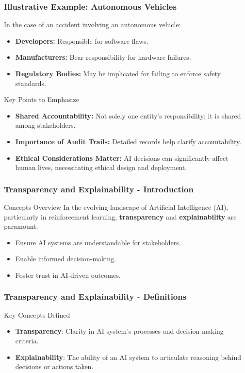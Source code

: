 \documentclass[aspectratio=169]{beamer}
\begin{document}
\begin{frame}[fragile]
    \frametitle{Illustrative Example: Autonomous Vehicles}
    In the case of an accident involving an autonomous vehicle:
    \begin{itemize}
        \item \textbf{Developers:} Responsible for software flaws.
        \item \textbf{Manufacturers:} Bear responsibility for hardware failures.
        \item \textbf{Regulatory Bodies:} May be implicated for failing to enforce safety standards.
    \end{itemize}

    \begin{block}{Key Points to Emphasize}
        \begin{itemize}
            \item \textbf{Shared Accountability:} Not solely one entity's responsibility; it is shared among stakeholders.
            \item \textbf{Importance of Audit Trails:} Detailed records help clarify accountability.
            \item \textbf{Ethical Considerations Matter:} AI decisions can significantly affect human lives, necessitating ethical design and deployment.
        \end{itemize}
    \end{block}
\end{frame}

\begin{frame}[fragile]
    \frametitle{Transparency and Explainability - Introduction}
    \begin{block}{Concepts Overview}
        In the evolving landscape of Artificial Intelligence (AI), particularly in reinforcement learning, \textbf{transparency} and \textbf{explainability} are paramount. 
        \begin{itemize}
            \item Ensure AI systems are understandable for stakeholders.
            \item Enable informed decision-making.
            \item Foster trust in AI-driven outcomes.
        \end{itemize}
    \end{block}
\end{frame}

\begin{frame}[fragile]
    \frametitle{Transparency and Explainability - Definitions}
    \begin{block}{Key Concepts Defined}
        \begin{itemize}
            \item \textbf{Transparency}: Clarity in AI system's processes and decision-making criteria.
            \item \textbf{Explainability}: The ability of an AI system to articulate reasoning behind decisions or actions taken.
        \end{itemize}
    \end{block}
\end{frame}
\end{document}
